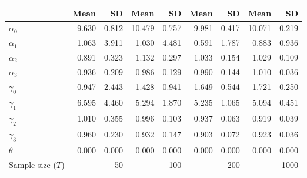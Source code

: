 
\begin{tabular}[t]{lrrrrrrrr}
\toprule
  & Mean & SD & Mean  & SD  & Mean   & SD   & Mean    & SD   \\
\midrule
$\alpha_{0}$ & 9.630 & 0.812 & 10.479 & 0.757 & 9.981 & 0.417 & 10.071 & 0.219\\
$\alpha_{1}$ & 1.063 & 3.911 & 1.030 & 4.481 & 0.591 & 1.787 & 0.883 & 0.936\\
$\alpha_{2}$ & 0.891 & 0.323 & 1.132 & 0.297 & 1.033 & 0.154 & 1.029 & 0.109\\
$\alpha_{3}$ & 0.936 & 0.209 & 0.986 & 0.129 & 0.990 & 0.144 & 1.010 & 0.036\\
$\gamma_{0}$ & 0.947 & 2.443 & 1.428 & 0.941 & 1.649 & 0.544 & 1.721 & 0.250\\
$\gamma_{1}$ & 6.595 & 4.460 & 5.294 & 1.870 & 5.235 & 1.065 & 5.094 & 0.451\\
$\gamma_{2}$ & 1.010 & 0.355 & 0.996 & 0.103 & 0.937 & 0.063 & 0.919 & 0.039\\
$\gamma_{3}$ & 0.960 & 0.230 & 0.932 & 0.147 & 0.903 & 0.072 & 0.923 & 0.036\\
$\theta$ & 0.000 & 0.000 & 0.000 & 0.000 & 0.000 & 0.000 & 0.000 & 0.000\\
Sample size ($T$) &  & 50 &  & 100 &  & 200 &  & 1000\\
\bottomrule
\end{tabular}
